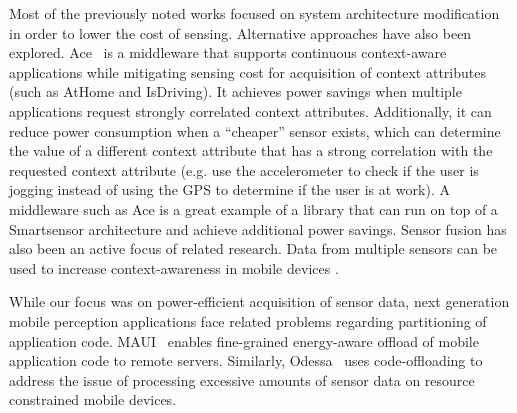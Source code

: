 Most of the previously noted works focused on system architecture 
modification in order to lower the cost of sensing. Alternative 
approaches have also been explored. Ace~\cite{ace} is a middleware that 
supports continuous context-aware applications while mitigating sensing 
cost for acquisition of context attributes (such as AtHome and IsDriving). 
It achieves power savings when multiple applications request strongly 
correlated context attributes. Additionally, it can reduce power 
consumption when a ``cheaper'' sensor exists, which can determine the 
value of a different context attribute that has a strong correlation with 
the requested context attribute (e.g. use the accelerometer to check if 
the user is jogging instead of using the GPS to determine if the user is 
at work). A middleware such as Ace is a great example of a library that 
can run on top of a Smartsensor architecture and achieve additional power savings. Sensor fusion 
has also been an active focus of related research. Data from multiple 
sensors can be used to increase context-awareness in mobile devices 
\cite{gellersen2002multi,biegel2004framework}.

While our focus was on power-efficient acquisition of sensor data, next 
generation mobile perception applications face related problems regarding 
partitioning of application code. MAUI~\cite{maui} enables fine-grained
energy-aware offload of mobile application code to remote 
servers. Similarly, Odessa~\cite{ra2011odessa} uses code-offloading to 
address the issue of processing excessive amounts of sensor data on 
resource constrained mobile devices.